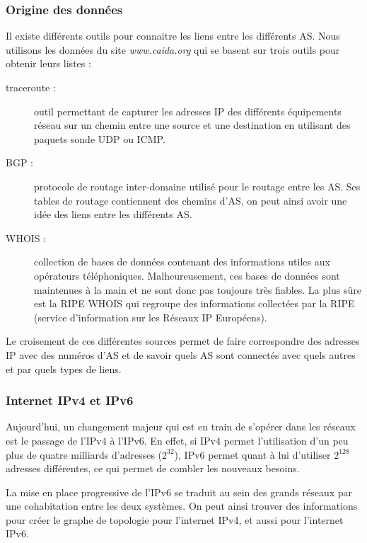 \subsubsection{Origine des donn\'ees}
\par
Il existe diff\'erents outils pour connaitre les liens entre les diff\'erents AS. Nous utilisons les donn\'ees du site \textit{www.caida.org} qui se basent sur trois outils pour obtenir leurs listes :
\begin{description}
 \item[traceroute : ] outil permettant de capturer les adresses IP des diff\'erents \'equipements r\'eseau sur un chemin entre une source et une destination en utilisant des paquets sonde UDP ou ICMP.
 \item[BGP : ] protocole de routage inter-domaine utilis\'e pour le routage entre les AS. Ses tables de routage contiennent des chemins d'AS, on peut ainsi avoir une idée des liens entre les diff\'erents AS.
 \item[WHOIS : ] collection de bases de donn\'ees contenant des informations utiles aux op\'erateurs t\'el\'ephoniques. Malheureusement, ces bases de donn\'ees sont maintenues \`a la main et ne  sont donc pas toujours tr\`es fiables. La plus sûre est la RIPE WHOIS qui regroupe des informations collect\'ees par la RIPE (service d'information sur les R\'eseaux IP Europ\'eens).
\end{description}
\par
Le croisement de ces diff\'erentes sources permet de faire correspondre des adresses IP avec des num\'eros d'AS et de savoir quels AS sont connect\'es avec quels autres et par quels types de liens.

\subsubsection{Internet IPv4 et IPv6}
\par
Aujourd'hui, un changement majeur qui est en train de s'op\'erer dans les r\'eseaux est le passage de l'IPv4 \`a l'IPv6. En effet, si IPv4 permet l'utilisation d'un peu plus de quatre milliards d'adresses ($2^32$), IPv6 permet quant \`a lui d'utiliser $2^128$ adresses diff\'erentes, ce qui permet de combler les nouveaux besoins.
\par
La mise en place progressive de l'IPv6 se traduit au sein des grands r\'eseaux par une cohabitation entre les deux syst\`emes. On peut ainsi trouver des informations pour cr\'eer le graphe de topologie pour l'internet IPv4, et aussi pour l'internet IPv6.


% 
